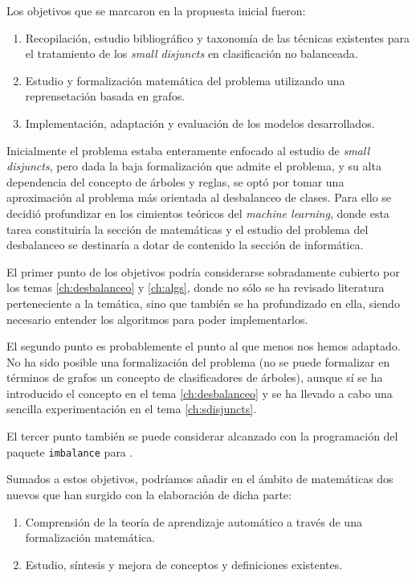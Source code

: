 Los objetivos que se marcaron en la propuesta inicial fueron:
\begin{enumerate}[i]
 \item Recopilación, estudio bibliográfico y taxonomía de las técnicas existentes para el tratamiento de los 
 \textit{small disjuncts} en clasificación no balanceada.
 \item Estudio y formalización matemática del problema utilizando una reprensetación basada en grafos.
 \item Implementación, adaptación y evaluación de los modelos desarrollados.
\end{enumerate}

Inicialmente el problema estaba enteramente enfocado al estudio de \textit{small disjuncts}, pero dada la baja formalización
que admite el problema, y su alta dependencia del concepto de árboles y reglas, se optó por tomar una aproximación 
al problema más orientada al desbalanceo de clases. Para ello se decidió profundizar en los cimientos
teóricos del \textit{machine learning}, donde esta tarea constituiría la sección de matemáticas y el estudio del problema
del desbalanceo se destinaría a dotar de contenido la sección de informática.

El primer punto de los objetivos podría considerarse sobradamente cubierto por los temas \ref{ch:desbalanceo} y 
\ref{ch:algs}, donde no sólo se ha revisado literatura perteneciente a la temática, sino que también se ha profundizado en
ella, siendo necesario entender los algoritmos para poder implementarlos.

El segundo punto es probablemente el punto al que menos nos hemos adaptado. No ha sido posible una formalización del problema
(no se puede formalizar en términos de grafos un concepto de clasificadores de árboles), aunque sí se ha introducido el
concepto en el tema \ref{ch:desbalanceo} y se ha llevado a cabo una sencilla experimentación en el tema \ref{ch:sdisjuncts}.

El tercer punto también se puede considerar alcanzado con la programación del paquete \texttt{imbalance} para \R.

Sumados a estos objetivos, podríamos añadir en el ámbito de matemáticas dos nuevos que han surgido con la elaboración de
dicha parte:
\begin{enumerate}[i]
 \item Comprensión de la teoría de aprendizaje automático a través de una formalización matemática.
 \item Estudio, síntesis y mejora de conceptos y definiciones existentes.
\end{enumerate}

